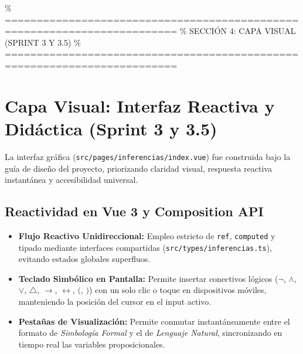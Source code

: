 \documentclass[11pt,a4paper]{article}
\begin{document}
\% =========================================================================
\% SECCIÓN 4: CAPA VISUAL (SPRINT 3 Y 3.5)
\% =========================================================================
\newpage
\section{Capa Visual: Interfaz Reactiva y Didáctica (Sprint 3 y 3.5)}

La interfaz gráfica (\texttt{src/pages/inferencias/index.vue}) fue construida bajo la guía de diseño del proyecto, priorizando claridad visual, respuesta reactiva instantánea y accesibilidad universal.

\subsection{Reactividad en Vue 3 y Composition API}
\begin{itemize}[leftmargin=1.2cm]
    \item \textbf{Flujo Reactivo Unidireccional:} Empleo estricto de \texttt{ref}, \texttt{computed} y tipado mediante interfaces compartidas (\texttt{src/types/inferencias.ts}), evitando estados globales superfluos.
    \item \textbf{Teclado Simbólico en Pantalla:} Permite insertar conectivos lógicos ($\neg$, $\land$, $\lor$, $\triangle$, $\to$, $\leftrightarrow$, $($, $)$) con un solo clic o toque en dispositivos móviles, manteniendo la posición del cursor en el input activo.
    \item \textbf{Pestañas de Visualización:} Permite conmutar instantáneamente entre el formato de \textit{Simbología Formal} y el de \textit{Lenguaje Natural}, sincronizando en tiempo real las variables proposicionales.
\end{itemize}
\end{document}
